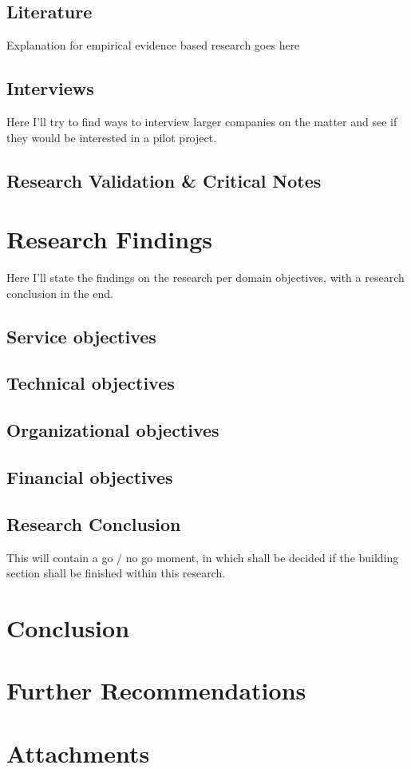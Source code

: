\documentclass[signatures]{Thesis}
\begin{document}
    \section{Literature}
    Explanation for empirical evidence based research goes here
    \section{Interviews}
    Here I'll try to find ways to interview larger companies on the matter and see if they would be interested in a pilot project.
    \section{Research Validation \& Critical Notes}
    
    
\chapter{Research Findings}
Here I'll state the findings on the research per domain objectives, with a research conclusion in the end.
	\section{Service objectives}
    \section{Technical objectives}
    \section{Organizational objectives}
    \section{Financial objectives}
	\section{Research Conclusion}
	This will contain a go / no go moment, in which shall be decided if the building section shall be finished within this research.
	

\chapter{Conclusion}

\chapter{Further Recommendations}

\chapter{Attachments}


\end{document}
